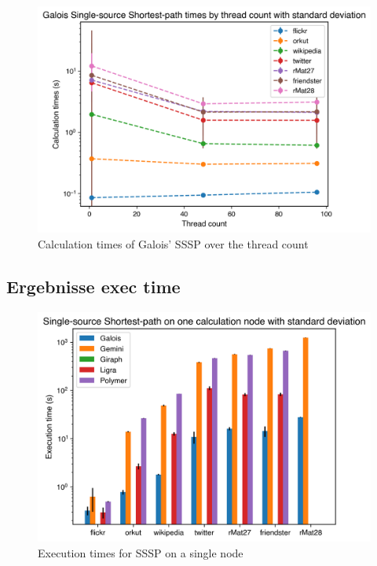 \begin{figure}
	\includegraphics[width=\columnwidth]{../../plots/singleNodeSSSPGaloisThreads.png}
	\caption{Calculation times of Galois' SSSP over the thread count}
	\label{fig:singleNodeSSSPGaloisThreads}
\end{figure}





\subsection{Ergebnisse exec time}
\begin{figure}
	\includegraphics[width=\columnwidth]{../../plots/singleNodeSSSP_execTime.png}
	\caption{Execution times for SSSP on a single node}
	\label{fig:singleNodeSSSP_exec}
\end{figure}


